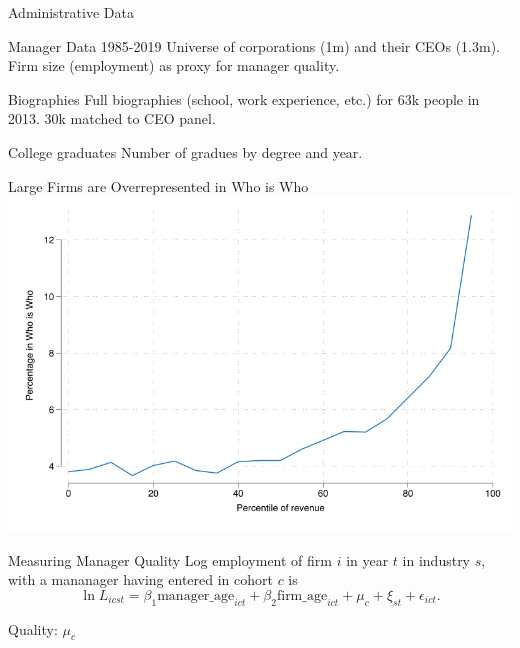 \documentclass[
  ignorenonframetext,
  aspectratio=1610,
]{beamer}
\begin{document}
\begin{frame}{Administrative Data}
\protect\hypertarget{administrative-data}{}
\begin{block}{Manager Data 1985-2019}
\protect\hypertarget{manager-data-1985-2019}{}
Universe of corporations (1m) and their CEOs (1.3m). Firm size
(employment) as proxy for manager quality.
\end{block}

\begin{block}{Biographies}
\protect\hypertarget{biographies}{}
Full biographies (school, work experience, etc.) for 63k people in 2013.
30k matched to CEO panel.
\end{block}

\begin{block}{College graduates}
\protect\hypertarget{college-graduates}{}
Number of gradues by degree and year.
\end{block}
\end{frame}

\begin{frame}{Large Firms are Overrepresented in Who is Who}
\protect\hypertarget{large-firms-are-overrepresented-in-who-is-who}{}
\includegraphics{fig/firm-wiw.png}
\end{frame}

\begin{frame}{Measuring Manager Quality}
\protect\hypertarget{measuring-manager-quality}{}
Log employment of firm \(i\) in year \(t\) in industry \(s\), with a
mananager having entered in cohort \(c\) is \[
\ln L_{icst} = \beta_1\text{manager\_age}_{ict} + \beta_2\text{firm\_age}_{ict}  + \mu_{c} + \xi_{st} + \epsilon_{ict}.
\]

Quality: \(\mu_c\)
\end{frame}
\end{document}
